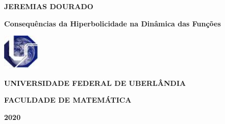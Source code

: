 %


\begin{center}
\textbf{JEREMIAS DOURADO}
\end{center}
\thispagestyle{empty}
\vspace{10cm}

\begin{center}
{\LARGE \textbf{Consequências da Hiperbolicidade na Dinâmica das Funções}}
\end{center}

\vspace{8cm}

\begin{center}
\includegraphics[height=0.678in,width=0.7022in]{logo/logoufu_0.jpg}



\textbf{UNIVERSIDADE FEDERAL DE UBERLÂNDIA}

\textbf{FACULDADE DE MATEMÁTICA}

\textbf{2020}

\end{center}

%

\newpage